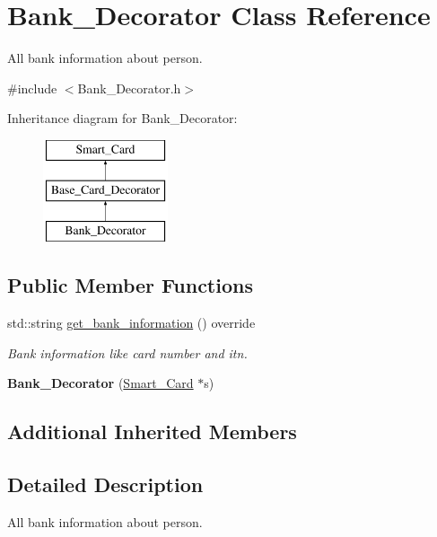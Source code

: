 \hypertarget{classBank__Decorator}{}\section{Bank\+\_\+\+Decorator Class Reference}
\label{classBank__Decorator}


All bank information about person.  




{\ttfamily \#include $<$Bank\+\_\+\+Decorator.\+h$>$}

Inheritance diagram for Bank\+\_\+\+Decorator\+:\begin{figure}[H]
\begin{center}
\leavevmode
\includegraphics[height=3.000000cm]{classBank__Decorator}
\end{center}
\end{figure}
\subsection*{Public Member Functions}
\begin{DoxyCompactItemize}
\item 
std\+::string \mbox{\hyperlink{classBank__Decorator_a3fe3f99e85f626f1e0a947c630bf7b00}{get\+\_\+bank\+\_\+information}} () override
\begin{DoxyCompactList}\small\item\em Bank information like card number and itn. \end{DoxyCompactList}\item 
\mbox{\label{classBank__Decorator_a401bc55d65cce554dd7394d0755fc3d7}} 
{\bfseries Bank\+\_\+\+Decorator} (\mbox{\hyperlink{classSmart__Card}{Smart\+\_\+\+Card}} $\ast$s)
\end{DoxyCompactItemize}
\subsection*{Additional Inherited Members}


\subsection{Detailed Description}
All bank information about person. 

